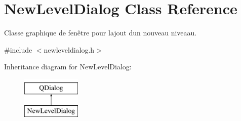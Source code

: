 \hypertarget{class_new_level_dialog}{}\section{New\+Level\+Dialog Class Reference}
\label{class_new_level_dialog}


Classe graphique de fenêtre pour l\textquotesingle{}ajout d\textquotesingle{}un nouveau niveaau.  




{\ttfamily \#include $<$newleveldialog.\+h$>$}

Inheritance diagram for New\+Level\+Dialog\+:\begin{figure}[H]
\begin{center}
\leavevmode
\includegraphics[height=2.000000cm]{class_new_level_dialog}
\end{center}
\end{figure}
